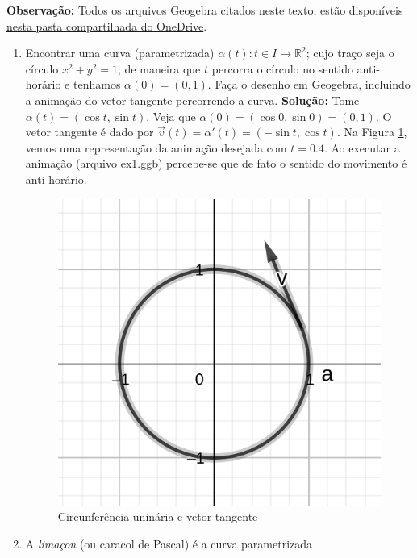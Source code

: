 \documentclass[12pt,letterpaper]{article}
\begin{document}
	
	\large{\textbf{Observação:}} Todos os arquivos Geogebra citados neste texto, estão disponíveis \href{https://gvmail-my.sharepoint.com/:f:/g/personal/b39398_fgv_edu_br/Euu4MOsNJNNEs3nZTImei1MBK16JRBHHiWUX9SxQeItAEg}{nesta pasta compartilhada do OneDrive}.
\begin{enumerate}
	\item Encontrar uma curva (parametrizada) $\alpha(t) : t \in I \to \mathbb{R}^2$; cujo traço seja o círculo
	$x^2 + y^2 = 1$; de maneira que $t$ percorra o círculo no sentido anti-horário e tenhamos $\alpha (0) = (0, 1)$. Faça o desenho em Geogebra, incluindo a animação do vetor tangente percorrendo a curva.
	\subitem \textbf{Solução:} Tome $\alpha (t) = (\cos t,\sin t)$. Veja que $\alpha(0)=(\cos 0,\sin 0) = (0,1)$. O vetor tangente é dado por $\vec v(t)=\alpha '(t)=(-\sin t,\cos t)$. Na Figura \ref{ex1}, vemos uma representação da animação desejada com $t=0.4$. Ao executar a animação (arquivo \href{https://gvmail-my.sharepoint.com/:f:/g/personal/b39398_fgv_edu_br/Euu4MOsNJNNEs3nZTImei1MBK16JRBHHiWUX9SxQeItAEg}{ex1.ggb}) percebe-se que de fato o sentido do movimento é anti-horário.
	\begin{figure}[!htb]
		\centering
		\label{ex1}
		\includegraphics[scale=2]{images/ex1.png}
		\caption{Circunferência uninária e vetor tangente}
	\end{figure}
	
	\item A \emph{limaçon} (ou caracol de Pascal) é a curva parametrizada 
	

\end{enumerate}
\end{document}
